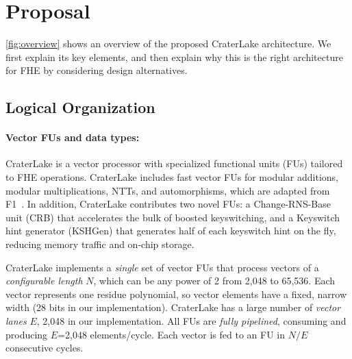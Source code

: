 \section{Proposal}

\autoref{fig:overview} shows an overview of the proposed CraterLake architecture. We first
explain its key elements, and then explain why this is the right architecture
for FHE by considering design alternatives.


\subsection{Logical Organization}

\paragraph{Vector FUs and data types:} CraterLake is a vector processor with
specialized functional units (FUs) tailored to FHE operations. CraterLake includes
fast vector FUs for modular additions, modular multiplications, NTTs, and
automorphisms, which are adapted from F1~\cite{feldmann:micro21:f1}. In
addition, CraterLake contributes two novel FUs: a Change-RNS-Base unit (CRB) that
accelerates the bulk of boosted keyswitching, and a Keyswitch hint generator
(KSHGen) that generates half of each keyswitch hint on the fly, reducing memory
traffic and on-chip storage.

\figOverview

CraterLake implements a \emph{single} set of vector FUs that process vectors of a
\emph{configurable length} $N$, which can be any power of 2 from 2,048 to
65,536. Each vector represents one residue polynomial, so vector elements have
a fixed, narrow width (28 bits in our implementation). CraterLake has a large number
of \emph{vector lanes} $E$, 2,048 in our implementation. All FUs are
\emph{fully pipelined}, consuming and producing $E$=2,048 elements/cycle. Each
vector is fed to an FU in $N/E$ consecutive cycles.
\newcommand{\Nmax}{N_{\textrm{max}}}
\newcommand{\Lmax}{L_{\textrm{max}}}
